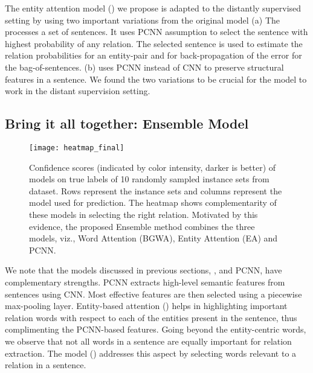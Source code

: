 \documentclass{article}
\begin{document}
The entity attention model (\systemea{}) we propose is adapted to the distantly supervised setting by using two important variations from the original \cite{byshen:2016} model (a) The \systemea{} processes a set of sentences. It uses PCNN \cite{zeng:2015} assumption to select the sentence with highest probability of any relation. The selected sentence is used to estimate the relation probabilities for an entity-pair and for back-propagation of the error for the bag-of-sentences. (b) \systemea{} uses PCNN instead of CNN to preserve structural features in a sentence. We found the two variations to be crucial for the model to work in the distant supervision setting. 





\subsection{Bring it all together: Ensemble Model}
\label{sec:ensemble}


\begin{figure}[t]
        \centering
        \setlength{\textfloatsep}{0.30cm}
        \texttt{[image: heatmap\_final]}
        


\caption{ Confidence scores (indicated by color intensity, darker is better) of models on true labels of 10 randomly sampled instance sets from \newdataset{} dataset. Rows represent the instance sets and columns represent the model used for prediction. The heatmap shows complementarity of these models in selecting the right relation. Motivated by this evidence, the proposed Ensemble method combines the three models, viz., Word Attention (BGWA), Entity Attention (EA) and PCNN.}
\label{fig:heatmap}
\end{figure}

We note that the models discussed in previous sections, \systemwa{}, \systemea{} and PCNN, have complementary strengths. PCNN extracts high-level semantic features from sentences using CNN. Most effective features are then selected using a piecewise max-pooling layer. Entity-based attention () helps in highlighting important relation words with respect to each of the entities present in the sentence, thus complimenting the PCNN-based features. Going beyond the entity-centric words, we observe that not all words in a sentence are equally important for relation extraction. The \systemwa{} model () addresses this aspect by selecting words relevant to a relation in a sentence. 
\end{document}
